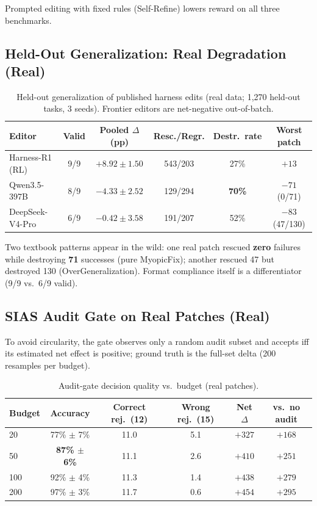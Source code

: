 \documentclass{article}
\begin{document}
Prompted editing with fixed rules (Self-Refine) lowers reward on all three benchmarks.

\subsection{Held-Out Generalization: Real Degradation (Real)}

\begin{table}[h]
\centering
\caption{Held-out generalization of published harness edits (real data; 1{,}270 held-out tasks, 3 seeds). Frontier editors are net-negative out-of-batch.}
\label{tab:heldout}
\begin{tabular}{lccccc}
\toprule
\textbf{Editor} & \textbf{Valid} & \textbf{Pooled $\Delta$ (pp)} & \textbf{Resc./Regr.} & \textbf{Destr.\ rate} & \textbf{Worst patch} \\
\midrule
Harness-R1 (RL) & 9/9 & $+8.92 \pm 1.50$ & 543/203 & 27\% & $+13$ \\
Qwen3.5-397B & 8/9 & $-4.33 \pm 2.52$ & 129/294 & \textbf{70\%} & $-71$ (0/71) \\
DeepSeek-V4-Pro & 6/9 & $-0.42 \pm 3.58$ & 191/207 & 52\% & $-83$ (47/130) \\
\bottomrule
\end{tabular}
\end{table}

Two textbook patterns appear in the wild: one real patch rescued \textbf{zero} failures while destroying \textbf{71} successes (pure MyopicFix); another rescued 47 but destroyed 130 (OverGeneralization). Format compliance itself is a differentiator (9/9 vs.\ 6/9 valid).

\subsection{SIAS Audit Gate on Real Patches (Real)}

To avoid circularity, the gate observes only a random audit subset and accepts iff its estimated net effect is positive; ground truth is the full-set delta (200 resamples per budget).

\begin{table}[h]
\centering
\caption{Audit-gate decision quality vs.\ budget (real patches).}
\label{tab:gate}
\begin{tabular}{lccccc}
\toprule
\textbf{Budget} & \textbf{Accuracy} & \textbf{Correct rej.\ (12)} & \textbf{Wrong rej.\ (15)} & \textbf{Net $\Delta$} & \textbf{vs.\ no audit} \\
\midrule
20 & 77\% $\pm$ 7\% & 11.0 & 5.1 & $+327$ & $+168$ \\
50 & \textbf{87\% $\pm$ 6\%} & 11.1 & 2.6 & $+410$ & $+251$ \\
100 & 92\% $\pm$ 4\% & 11.3 & 1.4 & $+438$ & $+279$ \\
200 & 97\% $\pm$ 3\% & 11.7 & 0.6 & $+454$ & $+295$ \\
\bottomrule
\end{tabular}
\end{table}
\end{document}
